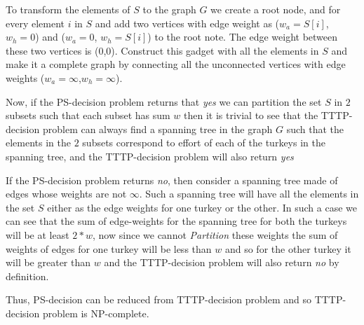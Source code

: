 \documentclass[8pt]{article}
\begin{document}
To transform the elements of $S$ to the graph $G$ we create a root node, and for every element $i$ in $S$ and add two vertices with edge weight as ($w_a = S[i]$, $w_h = 0$) and ($w_a = 0$, $w_h = S[i]$) to the root note. The edge weight between these two vertices is (0,0). Construct this gadget with all the elements in $S$ and make it a complete graph by connecting all the unconnected vertices with edge weights ($w_a = \infty$,$w_h = \infty$).

Now, if the PS-decision problem returns that \textit{yes} we can partition the set $S$ in $2$ subsets such that each subset has sum $w$ then it is trivial to see that the TTTP-decision problem can always find a spanning tree in the graph $G$ such that the elements in the $2$ subsets correspond to effort of each of the turkeys in the spanning tree, and the TTTP-decision problem will also return \textit{yes}

If the PS-decision problem returns \textit{no}, then consider a spanning tree made of edges whose weights are not $\infty$. Such a spanning tree will have all the elements in the set $S$ either as the edge weights for one turkey or the other. In such a case we can see that the sum of edge-weights for the spanning tree for both the turkeys will be at least $2*w$, now since we cannot \textit{Partition} these weights the sum of weights of edges for one turkey will be less than $w$ and so for the other turkey it will be greater than $w$ and the TTTP-decision problem will also return \textit{no} by definition.

Thus, PS-decision can be reduced from TTTP-decision problem and so TTTP-decision problem is NP-complete.
\end{document}
